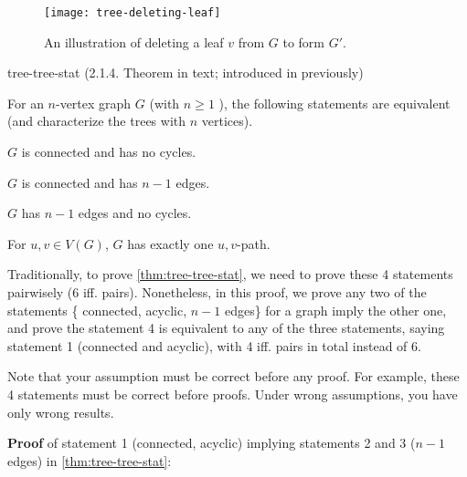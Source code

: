 \documentclass[../src/handouts/main.tex]{subfiles}
\begin{document}
\begin{figure}[htbp]
  \centering
  \texttt{[image: tree-deleting-leaf]}
  \caption{An illustration of deleting a leaf $v$ from $G$ to form $G'$.}
  \label{fig:tree-deleting-leaf}
\end{figure}

\begin{theorem}{}{tree-tree-stat}
  (2.1.4. Theorem in text; introduced in  previously)

  For an $n$-vertex graph $G$ (with $n \geq 1$ ), the following statements are equivalent (and characterize the trees with $n$ vertices).
  \begin{enumerate*}
    \item $G$ is connected and has no cycles.
    \item $G$ is connected and has $n - 1$ edges.
    \item $G$ has $n - 1$ edges and no cycles.
    \item For $u, v \in V(G)$, $G$ has exactly one $u,v$-path.
  \end{enumerate*}
\end{theorem}

Traditionally, to prove \cref{thm:tree-tree-stat}, we need to prove these 4 statements pairwisely (6 iff. pairs). Nonetheless, in this proof, we prove any two of the statements \{ connected, acyclic, $n - 1$ edges\} for a graph imply the other one, and prove the statement 4 is equivalent to any of the three statements, saying statement 1 (connected and acyclic), with 4 iff. pairs in total instead of 6.

Note that your assumption must be correct before any proof. For example, these 4 statements must be correct before proofs. Under wrong assumptions, you have only wrong results.

\textbf{Proof} of statement 1 (connected, acyclic) implying statements 2 and 3 ($n - 1$ edges) in \cref{thm:tree-tree-stat}:
\end{document}
